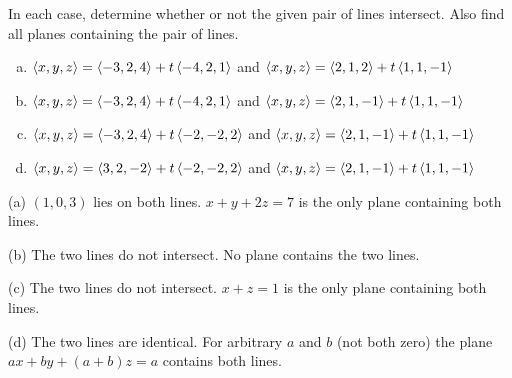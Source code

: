 \begin{question}
In each case, determine whether or not the given pair
of lines intersect. Also find all planes containing the pair of lines.
\begin{enumerate}[(a)]
\item $\left< x,y,z\right> = \left< -3,2,4\right>+t\left< -4,2,1\right>$ and 
      $\left< x,y,z\right> = \left< 2,1,2\right>+t\left< 1,1,-1\right>$
\item $\left< x,y,z\right> = \left< -3,2,4\right>+t\left< -4,2,1\right>$ and 
      $\left< x,y,z\right> = \left< 2,1,-1\right>+t\left< 1,1,-1\right>$
\item $\left< x,y,z\right> = \left< -3,2,4\right>+t\left< -2,-2,2\right>$ and 
      $\left< x,y,z\right> = \left< 2,1,-1\right>+t\left< 1,1,-1\right>$
\item $\left< x,y,z\right> = \left< 3,2,-2\right>+t\left< -2,-2,2\right>$ and 
      $\left< x,y,z\right> = \left< 2,1,-1\right>+t\left< 1,1,-1\right>$
\end{enumerate}
\end{question}


\begin{answer}
(a) $(1,0,3)$ lies on both lines.
     $x+y+2z=7$ is the only plane containing both lines.

(b) The two lines do not intersect. No plane contains the two lines.

(c) The two lines do not intersect.
     $x+z=1$ is the only plane containing both lines.

(d) The two lines are identical.
    For arbitrary $a$ and $b$ (not both zero) the plane $ax+by+(a+b)z=a$
    contains both lines.
\end{answer}

